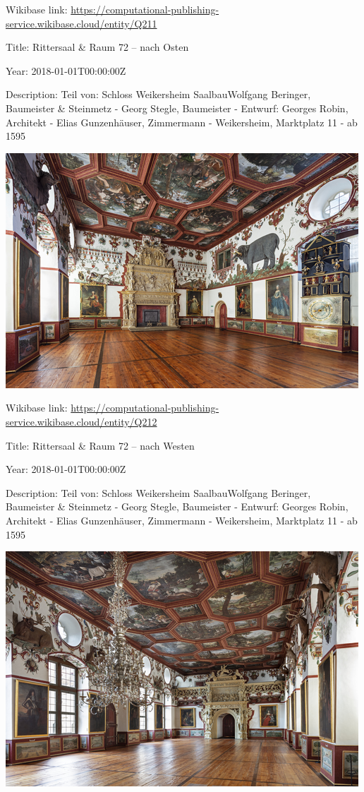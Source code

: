 \documentclass[
  letterpaper,
]{book}
\begin{document}
Wikibase link:
\url{https://computational-publishing-service.wikibase.cloud/entity/Q211}

Title: Rittersaal \& Raum 72 -- nach Osten

Year: 2018-01-01T00:00:00Z

Description: Teil von: Schloss Weikersheim SaalbauWolfgang Beringer,
Baumeister \& Steinmetz - Georg Stegle, Baumeister - Entwurf: Georges
Robin, Architekt - Elias Gunzenhäuser, Zimmermann - Weikersheim,
Marktplatz 11 - ab 1595

\includegraphics{paintings_files/figure-pdf/cell-3-output-58.png}

Wikibase link:
\url{https://computational-publishing-service.wikibase.cloud/entity/Q212}

Title: Rittersaal \& Raum 72 -- nach Westen

Year: 2018-01-01T00:00:00Z

Description: Teil von: Schloss Weikersheim SaalbauWolfgang Beringer,
Baumeister \& Steinmetz - Georg Stegle, Baumeister - Entwurf: Georges
Robin, Architekt - Elias Gunzenhäuser, Zimmermann - Weikersheim,
Marktplatz 11 - ab 1595

\includegraphics{paintings_files/figure-pdf/cell-3-output-60.png}
\end{document}
